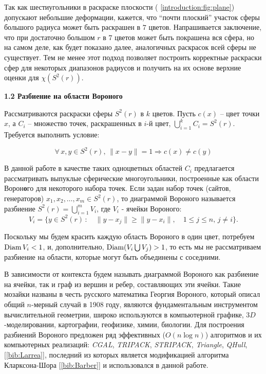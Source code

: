 Так как шестиугольники в раскраске плоскости (\figurename{ \ref{introduction:fig:plane}}) допускают небольшие деформации, кажется, что \enquote{почти плоский} участок сферы большого радиуса может быть раскрашен в $7$ цветов. Напрашивается заключение, что при достаточно большом $r$ в $7$ цветов может быть покрашена вся сфера, но на самом деле, как будет показано далее, аналогичных раскрасок всей сферы не существует. Тем не менее этот подход позволяет построить корректные 
раскраски сфер для некоторых диапазонов радиусов и получить на их основе верхние оценки для $\chi(S^2(r))$.

\vspace{5pt}
\textbf{1.2 Разбиение на области Вороного}\label{chapters:1.2}
\vspace{5pt}

Рассматриваются раскраски сферы $S^2(r)$ в $k$ цветов. 
Пусть $c(x)$ -- цвет точки $x$, а $C_i$ -- множество точек, раскрашенных в $i$-й цвет, $\bigcup\limits_{i=1}^{k} C_i = S^2(r)$. 
Требуется выполнить условие:

\begin{equation}\label{chapter1:propercoloring}
\forall \, x,y \in S^2(r), \, \|x - y\|=1 \Rightarrow c(x) \ne c(y)
\end{equation}

В данной работе в качестве таких одноцветных областей $C_i$ предлагается 
рассматривать выпуклые сферические многоугольники, построенные как области Ворон\textbf{о}го для некоторого набора точек.
Если задан набор точек (сайтов, генераторов) $x_1, x_2, \dots , x_m \in S^2(r)$, то диаграммой Вороного называется разбиение
$S^2(r)= \bigcup\limits_{i=1}^m V_i$, где $V_i$ - ячейки Вороного:
$$V_i = \{y \in S^2(r) \, : \quad \|y - x_j\| \geq \|y - x_i\|, \quad 1 \leq j \leq n, \, j \neq i \}.$$

Поскольку мы будем красить каждую область Вороного в один цвет, потребуем $\operatorname{Diam} V_i < 1$, и, 
дополнительно, $\operatorname{Diam} (V_i \bigcup V_j) > 1$, 
то есть мы не рассматриваем разбиение на области, которые могут быть объединены с соседними. 

В зависимости от контекста будем называть диаграммой Вороного как разбиение на ячейки, так и граф из вершин и ребер, составляющих эти ячейки. Такие мозайки названы в честь русского математика Георгия Вороного, который описал общий $n$-мерный случай в 1908 году,
являются фундаментальным инструментом вычислительной геометрии, широко используются в компьютерной графике, $3D$-моделировании, картографии, геофизике, химии, биологии. 
Для построения разбиений Вороного предложен ряд эффективных ($O(n\log{}n)$) алгоритмов и их компьютерных реализаций: 
\textit{CGAL}, \textit{TRIPACK}, \textit{STRIPACK}, \textit{Triangle}, \textit{QHull}, 
[\ref{bib:Larrea}], последний из которых является модификацией алгоритма Кларксона-Шора [\ref{bib:Barber}] и использовался в данной работе.

